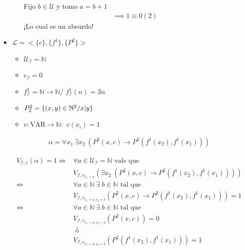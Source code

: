 \begin{itemize}
\begin{enumerate}
            Fijo $b \in \mathcal{U}$ y tomo $a = b+1$
            \begin{gather*}
                \implies 1 \equiv 0 (2)
            \end{gather*}
            ¡Lo cual es un absurdo!
    \end{enumerate}

    \item $\mathcal{L} = <\{ c \}, \{ f^1 \}, \{ P^2 \}>$

        \begin{itemize}
            \item $\mathcal{U}_{\mathcal{I}} = \mathbb{N}$
            \item $c_{\mathcal{I}} = 0$
            \item $f_{\mathcal{I}}^{1} = \mathbb{N} \to \mathbb{N}/$
            $f_{\mathcal{I}}^{1} (n) = 3n$
            \item $P_{\mathcal{I}}^{2} = 
                \{ (x,y) \in \mathbb{N}^2 / \divides{x}{y} \}$
            \item $v: \mathrm{VAR} \to \mathbb{N}:$
                $v(x_i) = 1$ 
        \end{itemize}

        \begin{gather*}
            \alpha = \forall x_1 ~ \exists x_2 ~ 
            \left( P^2(x,c) \to P^2(f^{1}(x_2),f^{1}(x_1))\right)
        \end{gather*}

        \begin{align*}
            V_{\mathcal{I}, v}(\alpha) = 1 \iff& 
            \forall a \in \mathcal{U}_{\mathcal{I}} = \mathbb{N}
            \text{ vale que} \\
            & V_{\mathcal{I}, v_{x_1 = a}} \left(\exists x_2 ~ 
            \left( P^2(x,c) \to P^2(f^{1}(x_2),f^{1}(x_1))\right)\right) \\
            \iff& \forall a \in \mathbb{N} ~ 
            \exists \; b \in \mathbb{N} \text{ tal que}\\
            &V_{\mathcal{I}, v_{x_1 = a, x_2 = b}}
            \left(P^2(x,c)\to P^2(f^{1}(x_2), f^{1}(x_1))\right) = 1 \\
            \iff& \forall a \in \mathbb{N} ~ 
            \exists \; b \in \mathbb{N} \text{ tal que}\\
            &V_{\mathcal{I}, v_{x_1 = a, x_2 = b}} \left(P^2(x,c)\right) = 0
            \\ & \text{ ó }\\
            &V_{\mathcal{I}, v_{x_1 = a, x_2 = b}} 
            \left(P^2(f^{1}(x_2), f^{1}(x_1))\right) = 1
        \end{align*}


\end{itemize}
